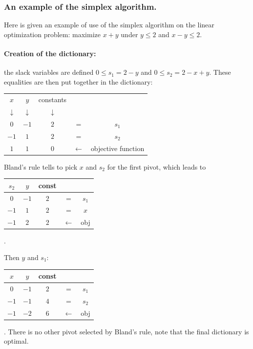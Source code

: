 \subsubsection{An example of the simplex algorithm.} Here is given an example of use of the simplex algorithm on the linear optimization problem: maximize $x+y$ under $y\leq 2$ and $x-y\leq 2$.
\vspace*{-0.4cm}
\begin{multicols}{2}
\paragraph{Creation of the dictionary:} the slack variables are defined $0 \leq s_1 = 2-y$ and $0\leq s_2=2-x+y$. These equalities are then put together in the dictionary:
\begin{tabular}{| c | c || c || c c |}
\hline	
$x$ & $y$ & constants & & \\
$\downarrow$ &$\downarrow$ &$\downarrow$ & & \\
\hline
\hline	
$0$ & $-1$ & $2$ & = & $s_1$\\ \hline	
$-1$ & $1$ & $2$ & = & $s_2$\\ \hline \hline	
$1$ & $1$ & $0$ & $\leftarrow$ & objective function \\
\hline	
\end{tabular}

Bland's rule tells to pick $x$ and $s_2$ for the first pivot, which leads to
\begin{tabular}{| c | c || c || c c |}
\hline
$s_2$ & $y$ & const & & \\
\hline
\hline	
$0$ & $-1$ & $2$ & = & $s_1$\\ \hline	
$-1$ & $1$ & $2$ & = & $x$\\ \hline \hline	
$-1$ & $2$ & $2$ & $\leftarrow$ & obj \\
\hline	
\end{tabular}.


Then $y$ and $s_1$: 
\begin{tabular}{| c | c || c || c c |}
\hline
$x$ & $y$ & const & & \\
\hline
\hline	
$0$ & $-1$ & $2$ & = & $s_1$\\ \hline	
$-1$ & $-1$ & $4$ & = & $s_2$\\ \hline \hline	
$-1$ & $-2$ & $6$ & $\leftarrow$ & obj \\
\hline	
\end{tabular}.
There is no other pivot selected by Bland's rule, note that the final dictionary is optimal.


\end{multicols}
